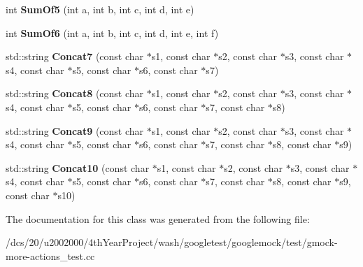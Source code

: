\begin{DoxyCompactItemize}
\item 
\mbox{\label{classtesting_1_1gmock__more__actions__test_1_1Foo_a55fb0cdc224c450f401e0fea4f979512}} 
int {\bfseries Sum\+Of5} (int a, int b, int c, int d, int e)
\item 
\mbox{\label{classtesting_1_1gmock__more__actions__test_1_1Foo_a34b5ae7cd4620331af92c637e3534bc4}} 
int {\bfseries Sum\+Of6} (int a, int b, int c, int d, int e, int f)
\item 
\mbox{\label{classtesting_1_1gmock__more__actions__test_1_1Foo_a5ff9313371e65a91b086afdc2032b0eb}} 
std\+::string {\bfseries Concat7} (const char $\ast$s1, const char $\ast$s2, const char $\ast$s3, const char $\ast$s4, const char $\ast$s5, const char $\ast$s6, const char $\ast$s7)
\item 
\mbox{\label{classtesting_1_1gmock__more__actions__test_1_1Foo_a25b91cea8633d026fe3f4a36c1574b8e}} 
std\+::string {\bfseries Concat8} (const char $\ast$s1, const char $\ast$s2, const char $\ast$s3, const char $\ast$s4, const char $\ast$s5, const char $\ast$s6, const char $\ast$s7, const char $\ast$s8)
\item 
\mbox{\label{classtesting_1_1gmock__more__actions__test_1_1Foo_a8f5b145b0cd23055630b2f9d10b3f45b}} 
std\+::string {\bfseries Concat9} (const char $\ast$s1, const char $\ast$s2, const char $\ast$s3, const char $\ast$s4, const char $\ast$s5, const char $\ast$s6, const char $\ast$s7, const char $\ast$s8, const char $\ast$s9)
\item 
\mbox{\label{classtesting_1_1gmock__more__actions__test_1_1Foo_ad5b1d2dd1bcec98fdc90a05487ec3b14}} 
std\+::string {\bfseries Concat10} (const char $\ast$s1, const char $\ast$s2, const char $\ast$s3, const char $\ast$s4, const char $\ast$s5, const char $\ast$s6, const char $\ast$s7, const char $\ast$s8, const char $\ast$s9, const char $\ast$s10)
\end{DoxyCompactItemize}


The documentation for this class was generated from the following file\+:\begin{DoxyCompactItemize}
\item 
/dcs/20/u2002000/4th\+Year\+Project/wash/googletest/googlemock/test/gmock-\/more-\/actions\+\_\+test.\+cc\end{DoxyCompactItemize}
